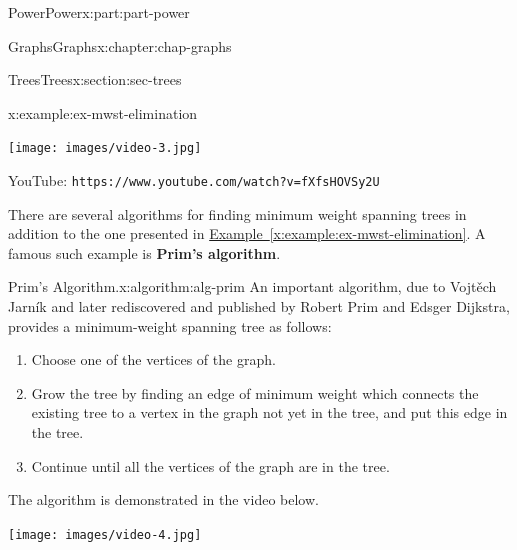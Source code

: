 \documentclass[oneside,10pt,]{book}
\newcommand{\xreffont}{\relax}
\newcommand{\mono}[1]{\texttt{#1}}
\newcommand{\terminology}[1]{\textbf{#1}}
\numberwithin{equation}{section}
\newlength{\qrsize}
\newlength{\previewwidth}
\begin{document}
\begin{partptx}{Power}{}{Power}{}{}{x:part:part-power}
\begin{chapterptx}{Graphs}{}{Graphs}{}{}{x:chapter:chap-graphs}
\begin{sectionptx}{Trees}{}{Trees}{}{}{x:section:sec-trees}
\begin{example}{}{x:example:ex-mwst-elimination}
\setlength{\qrsize}{9em}
\setlength{\previewwidth}{\linewidth}
\addtolength{\previewwidth}{-\qrsize}
\begin{tcbraster}[raster columns=2, raster column skip=1pt, raster halign=center, raster force size=false, raster left skip=0pt, raster right skip=0pt]%
\begin{tcolorbox}[previewstyle, width=\previewwidth]%
\texttt{[image: images/video-3.jpg]}%
\end{tcolorbox}%
\begin{tcolorbox}[qrstyle]%
{\hypersetup{urlcolor=black}}%
\end{tcolorbox}%
\begin{tcolorbox}[captionstyle]%
\small YouTube: \mono{https://www.youtube.com/watch?v=fXfsHOVSy2U}\end{tcolorbox}%
\end{tcbraster}%
\end{example}
There are several algorithms for finding minimum weight spanning trees in addition to the one presented in \hyperref[x:example:ex-mwst-elimination]{Example~{\xreffont\ref{x:example:ex-mwst-elimination}}}. A famous such example is \terminology{Prim's algorithm}.%
\begin{algorithm}{Prim's Algorithm.}{}{x:algorithm:alg-prim}%
An important algorithm, due to Vojtěch Jarník and later rediscovered and published by Robert Prim and Edsger Dijkstra, provides a minimum-weight spanning tree as follows:%
%
\begin{enumerate}
\item{}Choose one of the vertices of the graph.%
\item{}Grow the tree by finding an edge of minimum weight which connects the existing tree to a vertex in the graph not yet in the tree, and put this edge in the tree.%
\item{}Continue until all the vertices of the graph are in the tree.%
\end{enumerate}
The algorithm is demonstrated in the video below.%
\setlength{\qrsize}{9em}
\setlength{\previewwidth}{\linewidth}
\addtolength{\previewwidth}{-\qrsize}
\begin{tcbraster}[raster columns=2, raster column skip=1pt, raster halign=center, raster force size=false, raster left skip=0pt, raster right skip=0pt]%
\begin{tcolorbox}[previewstyle, width=\previewwidth]%
\texttt{[image: images/video-4.jpg]}%
\end{tcolorbox}%

\end{tcbraster}
\end{algorithm}
\end{sectionptx}
\end{chapterptx}
\end{partptx}
\end{document}
